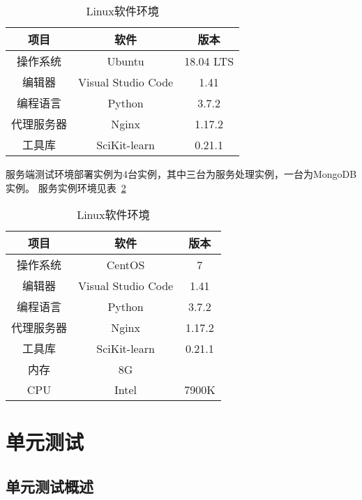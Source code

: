 \begin{table}[h]
    \centering
    \caption{Linux软件环境}
    \begin{tabular}{|*{3}{c|}}
        \hline
        项目       & 软件               & 版本      \\
        \hline
        操作系统   & Ubuntu             & 18.04 LTS \\
        \hline
        编辑器     & Visual Studio Code & 1.41      \\
        编程语言   & Python             & 3.7.2     \\
        \hline
        代理服务器 & Nginx              & 1.17.2    \\
        \hline
        工具库     & SciKit-learn       & 0.21.1    \\
        \hline
    \end{tabular}
    \label{tab:local_test}
\end{table}

服务端测试环境部署实例为4台实例，其中三台为服务处理实例，一台为MongoDB实例。 服务实例环境见表~\ref{tab:server_test}
\begin{table}[h]
    \centering
    \caption{Linux软件环境}
    \begin{tabular}{|*{3}{c|}}
        \hline
        项目       & 软件               & 版本   \\
        \hline
        操作系统   & CentOS             & 7      \\
        \hline
        编辑器     & Visual Studio Code & 1.41   \\
        编程语言   & Python             & 3.7.2  \\
        \hline
        代理服务器 & Nginx              & 1.17.2 \\
        \hline
        工具库     & SciKit-learn       & 0.21.1 \\
        \hline
        内存       & 8G                 &        \\
        \hline
        CPU        & Intel              & 7900K  \\
        \hline
    \end{tabular}
    \label{tab:server_test}
\end{table}


\section{单元测试}

\subsection{单元测试概述}


